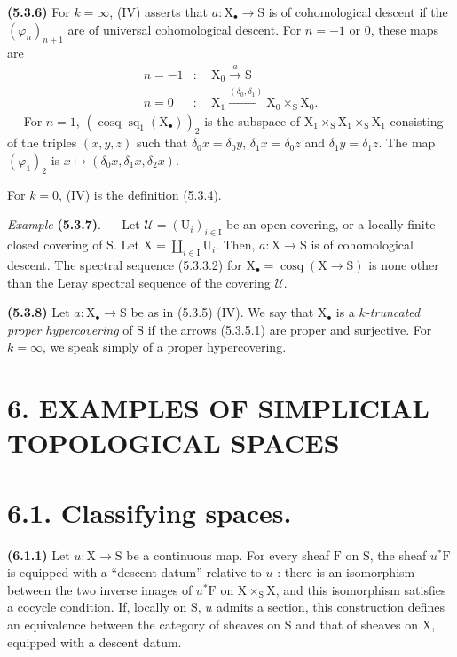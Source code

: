 \documentclass[11pt,leqno]{article}
\newcommand{\Page}[1]{\ifvmode\noindent\else\unskip\ \fi{\footnotesize\textcolor{gray}{[p.\,#1]}}\ \ignorespaces}
\begin{document}
\textbf{(5.3.6)} For \(k=\infty\), (IV) asserts that \(a:\mathrm{X}_{\bullet}\to\mathrm{S}\) is of cohomological descent if the \((\varphi_n)_{n+1}\) are of universal cohomological descent. For \(n=-1\) or \(0\), these maps are
\[
\begin{aligned}
n=-1&:\quad \mathrm{X}_0\xrightarrow{a}\mathrm{S}\\
n=0&:\quad \mathrm{X}_1\xrightarrow{(\delta_0,\delta_1)}
\mathrm{X}_0\times_{\mathrm{S}}\mathrm{X}_0.
\end{aligned}
\]
\Page{16}
For \(n=1\), \((\operatorname{cosq}\operatorname{sq}_1(\mathrm{X}_{\bullet}))_2\)  is the subspace of \(\mathrm{X}_1\times_{\mathrm{S}}\mathrm{X}_1\times_{\mathrm{S}}\mathrm{X}_1\) consisting of the triples \((x,y,z)\) such that \(\delta_0x=\delta_0y\), \(\delta_1x=\delta_0z\) and \(\delta_1y=\delta_1z\). The map \((\varphi_1)_2\) is \(x\mapsto(\delta_0x,\delta_1x,\delta_2x)\).

For \(k=0\), (IV) is the definition (5.3.4).

\textit{Example} \textbf{(5.3.7)}. — Let \(\mathcal{U}=(\mathrm{U}_i)_{i\in\mathrm{I}}\) be an open covering, or a locally finite closed covering of \(\mathrm{S}\). Let \(\mathrm{X}=\coprod\limits_{i\in\mathrm{I}}\mathrm{U}_i\). Then, \(a:\mathrm{X}\to\mathrm{S}\) is of cohomological descent. The spectral sequence (5.3.3.2) for \(\mathrm{X}_{\bullet}=\operatorname{cosq}(\mathrm{X}\to\mathrm{S})\) is none other than the Leray spectral sequence of the covering \(\mathcal{U}\).

\textbf{(5.3.8)} Let \(a:\mathrm{X}_{\bullet}\to\mathrm{S}\) be as in (5.3.5) (IV). We say that \(\mathrm{X}_{\bullet}\) is a \textit{\(k\)-truncated proper hypercovering} of \(\mathrm{S}\) if the arrows (5.3.5.1) are proper and surjective. For \(k=\infty\), we speak simply of a proper hypercovering.

\section*{6. EXAMPLES OF SIMPLICIAL TOPOLOGICAL SPACES}

\section*{6.1. Classifying spaces.}

\textbf{(6.1.1)} Let \(u:\mathrm{X}\to\mathrm{S}\) be a continuous map. For every sheaf \(\mathrm{F}\) on \(\mathrm{S}\), the sheaf \(u^*\mathrm{F}\) is equipped with a “descent datum” relative to \(u\) : there is an isomorphism between the two inverse images of \(u^*\mathrm{F}\) on \(\mathrm{X}\times_{\mathrm{S}}\mathrm{X}\), and this isomorphism satisfies a cocycle condition. If, locally on \(\mathrm{S}\), \(u\) admits a section, this construction defines an equivalence between the category of sheaves on \(\mathrm{S}\) and that of sheaves on \(\mathrm{X}\), equipped with a descent datum.
\end{document}
